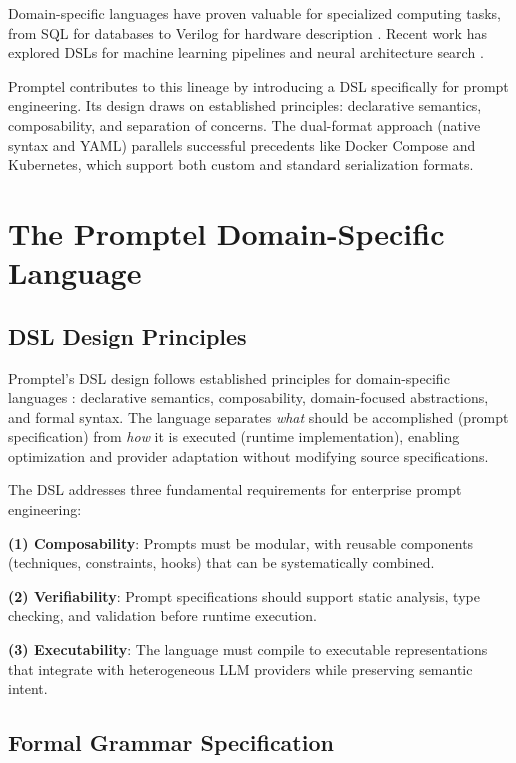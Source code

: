 \documentclass[11pt,a4paper]{article}
\begin{document}
Domain-specific languages have proven valuable for specialized computing tasks, from SQL for databases to Verilog for hardware description \cite{mernik2005and}. Recent work has explored DSLs for machine learning pipelines \cite{biewald2020experiment} and neural architecture search \cite{elsken2019neural}.

Promptel contributes to this lineage by introducing a DSL specifically for prompt engineering. Its design draws on established principles: declarative semantics, composability, and separation of concerns. The dual-format approach (native syntax and YAML) parallels successful precedents like Docker Compose and Kubernetes, which support both custom and standard serialization formats.

\section{The Promptel Domain-Specific Language}

\subsection{DSL Design Principles}

Promptel's DSL design follows established principles for domain-specific languages \cite{mernik2005and}: declarative semantics, composability, domain-focused abstractions, and formal syntax. The language separates \textit{what} should be accomplished (prompt specification) from \textit{how} it is executed (runtime implementation), enabling optimization and provider adaptation without modifying source specifications.

The DSL addresses three fundamental requirements for enterprise prompt engineering:

\textbf{(1) Composability}: Prompts must be modular, with reusable components (techniques, constraints, hooks) that can be systematically combined.

\textbf{(2) Verifiability}: Prompt specifications should support static analysis, type checking, and validation before runtime execution.

\textbf{(3) Executability}: The language must compile to executable representations that integrate with heterogeneous LLM providers while preserving semantic intent.

\subsection{Formal Grammar Specification}
\end{document}
